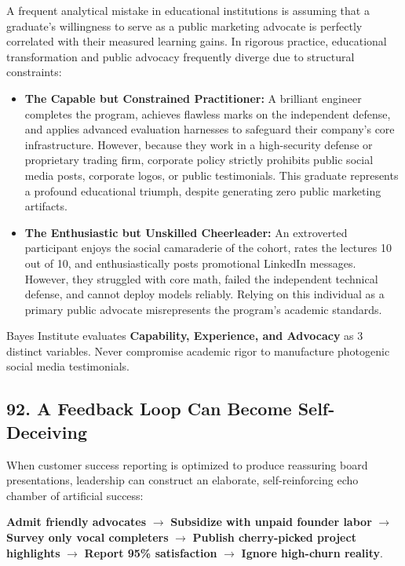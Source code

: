 A frequent analytical mistake in educational institutions is assuming that a graduate's willingness to serve as a public marketing advocate is perfectly correlated with their measured learning gains. In rigorous practice, educational transformation and public advocacy frequently diverge due to structural constraints:

\begin{itemize}[leftmargin=*]
\item \textbf{The Capable but Constrained Practitioner:} A brilliant engineer completes the program, achieves flawless marks on the independent defense, and applies advanced evaluation harnesses to safeguard their company's core infrastructure. However, because they work in a high-security defense or proprietary trading firm, corporate policy strictly prohibits public social media posts, corporate logos, or public testimonials. This graduate represents a profound educational triumph, despite generating zero public marketing artifacts.
\item \textbf{The Enthusiastic but Unskilled Cheerleader:} An extroverted participant enjoys the social camaraderie of the cohort, rates the lectures 10 out of 10, and enthusiastically posts promotional LinkedIn messages. However, they struggled with core math, failed the independent technical defense, and cannot deploy models reliably. Relying on this individual as a primary public advocate misrepresents the program's academic standards.
\end{itemize}

Bayes Institute evaluates \textbf{Capability, Experience, and Advocacy} as 3 distinct variables. Never compromise academic rigor to manufacture photogenic social media testimonials.

\subsection*{92. A Feedback Loop Can Become Self-Deceiving}

When customer success reporting is optimized to produce reassuring board presentations, leadership can construct an elaborate, self-reinforcing echo chamber of artificial success:
\begin{center}
\textbf{Admit friendly advocates} $\longrightarrow$ \textbf{Subsidize with unpaid founder labor} $\longrightarrow$ \textbf{Survey only vocal completers} $\longrightarrow$ \textbf{Publish cherry-picked project highlights} $\longrightarrow$ \textbf{Report 95\% satisfaction} $\longrightarrow$ \textbf{Ignore high-churn reality}.
\end{center}

